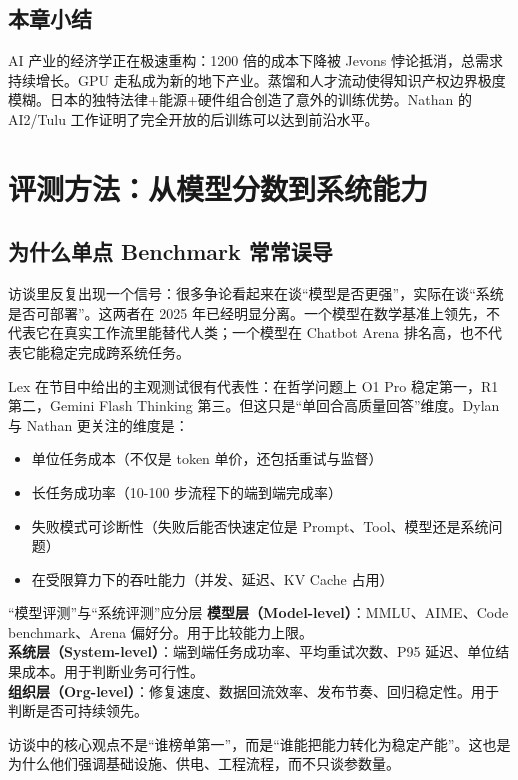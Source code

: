 \documentclass[a4paper]{article}
\begin{document}
\subsection{本章小结}

AI 产业的经济学正在极速重构：1200 倍的成本下降被 Jevons 悖论抵消，总需求持续增长。GPU 走私成为新的地下产业。蒸馏和人才流动使得知识产权边界极度模糊。日本的独特法律+能源+硬件组合创造了意外的训练优势。Nathan 的 AI2/Tulu 工作证明了完全开放的后训练可以达到前沿水平。

\section{评测方法：从模型分数到系统能力}

\subsection{为什么单点 Benchmark 常常误导}

访谈里反复出现一个信号：很多争论看起来在谈``模型是否更强''，实际在谈``系统是否可部署''。这两者在 2025 年已经明显分离。一个模型在数学基准上领先，不代表它在真实工作流里能替代人类；一个模型在 Chatbot Arena 排名高，也不代表它能稳定完成跨系统任务。

Lex 在节目中给出的主观测试很有代表性：在哲学问题上 O1 Pro 稳定第一，R1 第二，Gemini Flash Thinking 第三。但这只是``单回合高质量回答''维度。Dylan 与 Nathan 更关注的维度是：
\begin{itemize}
    \item 单位任务成本（不仅是 token 单价，还包括重试与监督）
    \item 长任务成功率（10-100 步流程下的端到端完成率）
    \item 失败模式可诊断性（失败后能否快速定位是 Prompt、Tool、模型还是系统问题）
    \item 在受限算力下的吞吐能力（并发、延迟、KV Cache 占用）
\end{itemize}

\begin{knowledgebox}{``模型评测''与``系统评测''应分层}
\textbf{模型层（Model-level）}：MMLU、AIME、Code benchmark、Arena 偏好分。用于比较能力上限。\\
\textbf{系统层（System-level）}：端到端任务成功率、平均重试次数、P95 延迟、单位结果成本。用于判断业务可行性。\\
\textbf{组织层（Org-level）}：修复速度、数据回流效率、发布节奏、回归稳定性。用于判断是否可持续领先。

访谈中的核心观点不是``谁榜单第一''，而是``谁能把能力转化为稳定产能''。这也是为什么他们强调基础设施、供电、工程流程，而不只谈参数量。
\end{knowledgebox}
\end{document}
